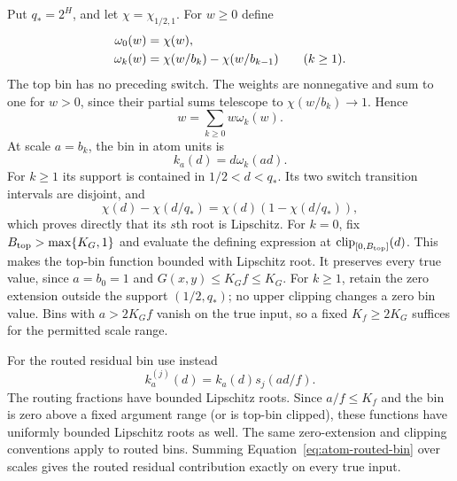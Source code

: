 Put $q_*=2^H$, and let $\chi=\chi_{1/2,1}$.  For $w\ge0$ define
\begin{align}
 \omega_0(w)&=\chi(w),\notag\\
 \omega_k(w)&=\chi(w/b_k)-\chi(w/b_{k-1})\qquad(k\ge1).
 \label{eq:atom-bin-weights}
\end{align}
The top bin has no preceding switch.  The weights are nonnegative and
sum to one for $w>0$, since their partial sums telescope to
$\chi(w/b_k)\to1$.  Hence
\begin{equation}
 w=\sum_{k\ge0}w\omega_k(w).
 \label{eq:atom-bin-partition}
\end{equation}
At scale $a=b_k$, the bin in atom units is
\begin{equation}
 k_a(d)=d\omega_k(ad).
 \label{eq:atom-bin-function}
\end{equation}
For $k\ge1$ its support is contained in $1/2<d<q_*$.
Its two switch transition intervals are disjoint, and
\[
 \chi(d)-\chi(d/q_*)=\chi(d)(1-\chi(d/q_*)),
\]
which proves directly that its $s$th root is Lipschitz.
For $k=0$, fix $B_{\rm top}>\max\{K_G,1\}$ and evaluate the defining
expression at $\operatorname{clip}_{[0,B_{\rm top}]}(d)$.
This makes the top-bin function bounded with Lipschitz root.  It
preserves every true value, since $a=b_0=1$ and
$G(x,y)\le K_G f\le K_G$.  For $k\ge1$, retain the zero extension
outside the support $(1/2,q_*)$; no upper clipping changes a zero bin
value.  Bins with $a>2K_G f$ vanish on the true input, so a fixed
$K_f\ge2K_G$ suffices for the permitted scale range.

For the routed residual bin use instead
\begin{equation}
 k_a^{(j)}(d)=k_a(d)s_j(ad/f).
 \label{eq:atom-routed-bin}
\end{equation}
The routing fractions have bounded Lipschitz roots.  Since $a/f\le K_f$
and the bin is zero above a fixed argument range (or is top-bin clipped),
these functions have uniformly bounded Lipschitz roots as well.  The
same zero-extension and clipping conventions apply to routed bins.
Summing Equation~\eqref{eq:atom-routed-bin} over scales gives the routed
residual contribution exactly on every true input.

